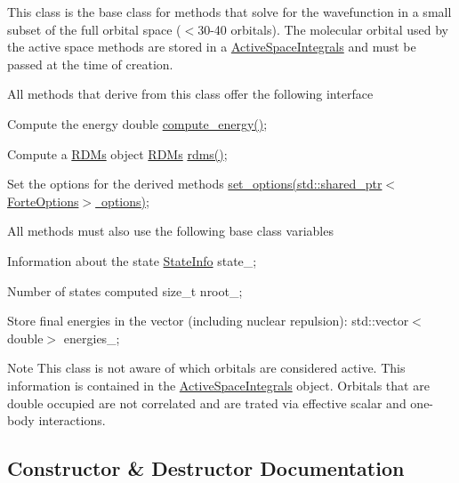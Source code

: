 This class is the base class for methods that solve for the wavefunction in a small subset of the full orbital space ($<$30-\/40 orbitals). The molecular orbital used by the active space methods are stored in a \mbox{\hyperlink{classforte_1_1_active_space_integrals}{Active\+Space\+Integrals}} and must be passed at the time of creation.

All methods that derive from this class offer the following interface


\begin{DoxyItemize}
\item Compute the energy double \mbox{\hyperlink{classforte_1_1_active_space_method_a99736e2b94405371b224b0750569b077}{compute\+\_\+energy()}};
\item Compute a \mbox{\hyperlink{classforte_1_1_r_d_ms}{R\+D\+Ms}} object \mbox{\hyperlink{classforte_1_1_r_d_ms}{R\+D\+Ms}} \mbox{\hyperlink{classforte_1_1_active_space_method_a0b2c4903551a7602db815d67349ba7c9}{rdms()}};
\item Set the options for the derived methods \mbox{\hyperlink{classforte_1_1_active_space_method_a9416a627f550d4d56f6b8ffe7478ed89}{set\+\_\+options(std\+::shared\+\_\+ptr$<$\+Forte\+Options$>$ options)}};
\end{DoxyItemize}

All methods must also use the following base class variables


\begin{DoxyItemize}
\item Information about the state \mbox{\hyperlink{classforte_1_1_state_info}{State\+Info}} state\+\_\+;
\item Number of states computed size\+\_\+t nroot\+\_\+;
\item Store final energies in the vector (including nuclear repulsion)\+: std\+::vector$<$double$>$ energies\+\_\+;
\end{DoxyItemize}

\begin{DoxyNote}{Note}
This class is not aware of which orbitals are considered active. This information is contained in the \mbox{\hyperlink{classforte_1_1_active_space_integrals}{Active\+Space\+Integrals}} object. Orbitals that are double occupied are not correlated and are trated via effective scalar and one-\/body interactions. 
\end{DoxyNote}


\subsection{Constructor \& Destructor Documentation}
\mbox{\label{classforte_1_1_active_space_method_afa70f2a1ba6e629d47aa9cd53aaff803}} 
